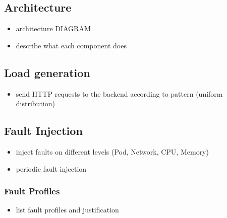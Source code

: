 \subsection{Architecture}


\begin{itemize}
	\item architecture DIAGRAM
	\item describe what each component does
\end{itemize}


\subsection{Load generation}

\begin{itemize}
	\item send HTTP requests to the backend according to pattern (uniform distribution)
\end{itemize}


\subsection{Fault Injection}

\begin{itemize}
	\item inject faults on different levels (Pod, Network, CPU, Memory)
	\item periodic fault injection
\end{itemize}


\subsubsection{Fault Profiles}

\begin{itemize}
	\item list fault profiles and justification
\end{itemize}


